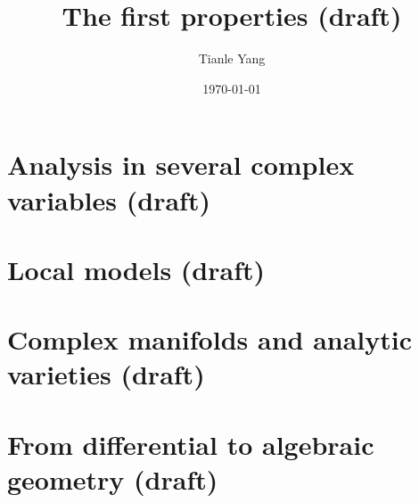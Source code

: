 \documentclass[sectionlevel=chapter]{noteformyself}
\title{The first properties (draft)}
\author{Tianle Yang}
\date{\today}
\begin{document}

    \tableofcontents

    \section{Analysis in several complex variables (draft)}
    
    \section{Local models (draft)}
    
    \section{Complex manifolds and analytic varieties (draft)}
    
    \section{From differential to algebraic geometry (draft)}
    

    \printbibliography[heading=bibintoc, title={References}]
\end{document}
